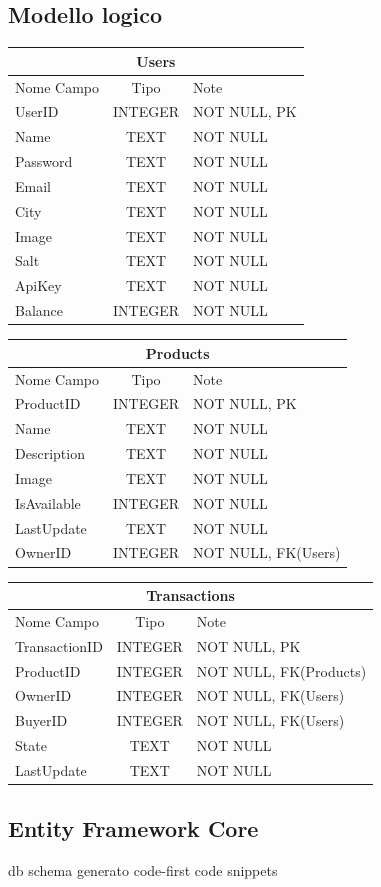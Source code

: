 \subsection{Modello logico}
\begin{center}
    \begin{tabular}{ |l|c|l| } 
    \hline
    \multicolumn{3}{|c|}{\textbf{Users}} \\
    \hline
    Nome Campo & Tipo & Note \\
    \hline
    UserID & INTEGER & NOT NULL, PK \\
    Name & TEXT & NOT NULL \\
    Password & TEXT & NOT NULL \\
    Email & TEXT & NOT NULL \\
    City & TEXT & NOT NULL \\
    Image & TEXT & NOT NULL \\
    Salt & TEXT & NOT NULL \\
    ApiKey & TEXT & NOT NULL \\
    Balance & INTEGER & NOT NULL \\
    \hline
    \end{tabular}
\end{center}
\begin{center}
    \begin{tabular}{ |l|c|l| } 
    \hline
    \multicolumn{3}{|c|}{\textbf{Products}} \\
    \hline
    Nome Campo & Tipo & Note \\
    \hline
    ProductID & INTEGER & NOT NULL, PK \\
    Name & TEXT & NOT NULL \\
    Description & TEXT & NOT NULL \\
    Image & TEXT & NOT NULL \\
    IsAvailable & INTEGER & NOT NULL \\
    LastUpdate & TEXT & NOT NULL \\
    OwnerID & INTEGER & NOT NULL, FK(Users) \\
    \hline
    \end{tabular}
\end{center}
\begin{center}
    \begin{tabular}{ |l|c|l| } 
    \hline
    \multicolumn{3}{|c|}{\textbf{Transactions}} \\
    \hline
    Nome Campo & Tipo & Note \\
    \hline
    TransactionID & INTEGER & NOT NULL, PK \\
    ProductID & INTEGER & NOT NULL, FK(Products) \\
    OwnerID & INTEGER & NOT NULL, FK(Users) \\
    BuyerID & INTEGER & NOT NULL, FK(Users) \\
    State & TEXT & NOT NULL \\
    LastUpdate & TEXT & NOT NULL \\
    \hline
    \end{tabular}
\end{center}
\subsection{Entity Framework Core}
db schema generato code-first
code snippets
